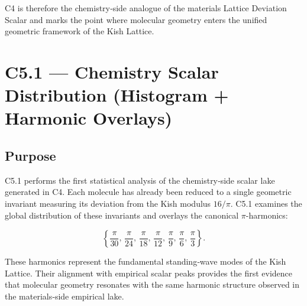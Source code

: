 \documentclass[11pt, letterpaper, openany]{book}
\begin{document}
C4 is therefore the chemistry‑side analogue of the materials Lattice Deviation
Scalar and marks the point where molecular geometry enters the unified geometric
framework of the Kish Lattice.


\section{C5.1 — Chemistry Scalar Distribution (Histogram + Harmonic Overlays)}

\subsection*{Purpose}
C5.1 performs the first statistical analysis of the chemistry‑side scalar lake
generated in C4. Each molecule has already been reduced to a single geometric
invariant measuring its deviation from the Kish modulus \(16/\pi\). C5.1 examines
the global distribution of these invariants and overlays the canonical
\(\pi\)-harmonics:



\[
\left\{ \frac{\pi}{30},\, \frac{\pi}{24},\, \frac{\pi}{18},\, \frac{\pi}{12},\,
\frac{\pi}{9},\, \frac{\pi}{6},\, \frac{\pi}{3} \right\}.
\]



These harmonics represent the fundamental standing‑wave modes of the Kish
Lattice. Their alignment with empirical scalar peaks provides the first evidence
that molecular geometry resonates with the same harmonic structure observed in
the materials‑side empirical lake.
\end{document}

